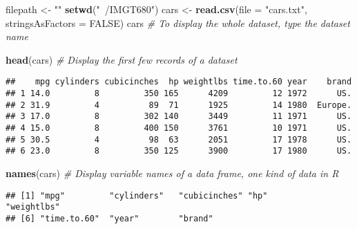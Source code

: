 \documentclass[11pt,]{article}
\newenvironment{Shaded}{\begin{snugshade}}{\end{snugshade}}
\newcommand{\CommentTok}[1]{\textcolor[rgb]{0.56,0.35,0.01}{\textit{#1}}}
\newcommand{\DataTypeTok}[1]{\textcolor[rgb]{0.13,0.29,0.53}{#1}}
\newcommand{\KeywordTok}[1]{\textcolor[rgb]{0.13,0.29,0.53}{\textbf{#1}}}
\newcommand{\NormalTok}[1]{#1}
\newcommand{\OperatorTok}[1]{\textcolor[rgb]{0.81,0.36,0.00}{\textbf{#1}}}
\newcommand{\OtherTok}[1]{\textcolor[rgb]{0.56,0.35,0.01}{#1}}
\newcommand{\StringTok}[1]{\textcolor[rgb]{0.31,0.60,0.02}{#1}}
\begin{document}
\begin{Shaded}
\begin{Highlighting}[]
\NormalTok{  filepath <-}\StringTok{ ""}
  \KeywordTok{setwd}\NormalTok{(}\StringTok{"~/IMGT680"}\NormalTok{)}
\NormalTok{  cars <-}\StringTok{ }\KeywordTok{read.csv}\NormalTok{(}\DataTypeTok{file =} \StringTok{"cars.txt"}\NormalTok{, }\DataTypeTok{stringsAsFactors =} \OtherTok{FALSE}\NormalTok{)}
\NormalTok{  cars }\CommentTok{# To display the whole dataset, type the dataset name}
\end{Highlighting}
\end{Shaded}

\begin{Shaded}
\begin{Highlighting}[]
  \KeywordTok{head}\NormalTok{(cars) }\CommentTok{# Display the first few records of a dataset}
\end{Highlighting}
\end{Shaded}

\begin{verbatim}
##    mpg cylinders cubicinches  hp weightlbs time.to.60 year    brand
## 1 14.0         8         350 165      4209         12 1972      US.
## 2 31.9         4          89  71      1925         14 1980  Europe.
## 3 17.0         8         302 140      3449         11 1971      US.
## 4 15.0         8         400 150      3761         10 1971      US.
## 5 30.5         4          98  63      2051         17 1978      US.
## 6 23.0         8         350 125      3900         17 1980      US.
\end{verbatim}

\begin{Shaded}
\begin{Highlighting}[]
  \KeywordTok{names}\NormalTok{(cars) }\CommentTok{# Display variable names of a data frame, one kind of data in R}
\end{Highlighting}
\end{Shaded}

\begin{verbatim}
## [1] "mpg"         "cylinders"   "cubicinches" "hp"          "weightlbs"  
## [6] "time.to.60"  "year"        "brand"
\end{verbatim}

\begin{Shaded}
\end{Shaded}
\end{document}
